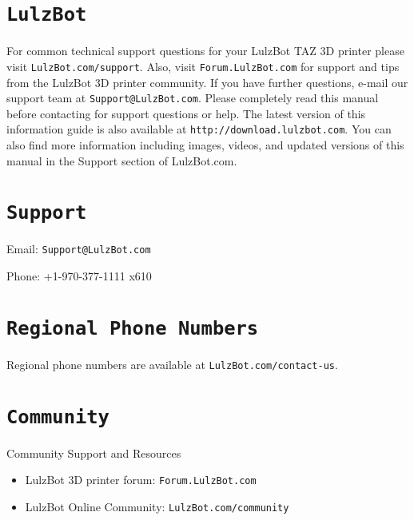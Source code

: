 %
%
%
%
%

\section{\texttt{LulzBot}}
\setlength{\parindent}{0pt}
For common technical support questions for your LulzBot\textsuperscript{\miniscule{\textregistered}} TAZ 3D printer please visit \texttt{LulzBot.com/support}. Also, visit \texttt{Forum.LulzBot.com} for support and tips from the LulzBot 3D printer community. If you have further questions, e-mail our support team at \texttt{Support@LulzBot.com}. Please completely read this manual before contacting for support questions or help. The latest version of this information guide is also available at \texttt{http://download.lulzbot.com}. You can also find more information including images, videos, and updated versions of this manual in the Support section of LulzBot.com.

\section{\texttt{Support}}
\setlength{\parindent}{0pt}
Email: \texttt{Support@LulzBot.com}

Phone: +1-970-377-1111 x610

\section{\texttt{Regional Phone Numbers}}
Regional phone numbers are available at \texttt{LulzBot.com/contact-us}.

\section{\texttt{Community}}
Community Support and Resources

\begin{itemize}

\item LulzBot 3D printer forum: \texttt{Forum.LulzBot.com}
\item LulzBot Online Community: \texttt{LulzBot.com/community}

\end{itemize}
